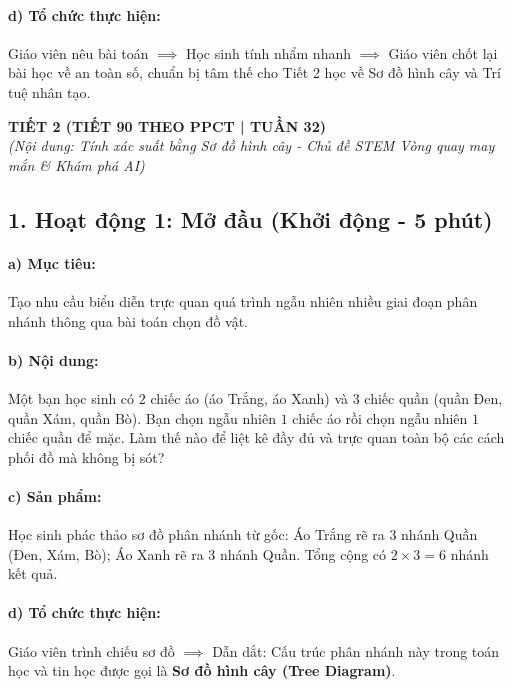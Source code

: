 \documentclass[12pt, a4paper]{article}
\begin{document}
\paragraph{d) Tổ chức thực hiện:} Giáo viên nêu bài toán $\implies$ Học sinh tính nhẩm nhanh $\implies$ Giáo viên chốt lại bài học về an toàn số, chuẩn bị tâm thế cho Tiết 2 học về Sơ đồ hình cây và Trí tuệ nhân tạo.

\newpage

\begin{center}
    \textbf{\large TIẾT 2 (TIẾT 90 THEO PPCT | TUẦN 32)}\\[4pt]
    \textit{(Nội dung: Tính xác suất bằng Sơ đồ hình cây - Chủ đề STEM Vòng quay may mắn \& Khám phá AI)}
\end{center}

\subsection*{1. Hoạt động 1: Mở đầu (Khởi động - 5 phút)}

\paragraph{a) Mục tiêu:} Tạo nhu cầu biểu diễn trực quan quá trình ngẫu nhiên nhiều giai đoạn phân nhánh thông qua bài toán chọn đồ vật.

\paragraph{b) Nội dung:} Một bạn học sinh có $2$ chiếc áo (áo Trắng, áo Xanh) và $3$ chiếc quần (quần Đen, quần Xám, quần Bò). Bạn chọn ngẫu nhiên $1$ chiếc áo rồi chọn ngẫu nhiên $1$ chiếc quần để mặc. Làm thế nào để liệt kê đầy đủ và trực quan toàn bộ các cách phối đồ mà không bị sót?

\paragraph{c) Sản phẩm:} Học sinh phác thảo sơ đồ phân nhánh từ gốc: Áo Trắng rẽ ra 3 nhánh Quần (Đen, Xám, Bò); Áo Xanh rẽ ra 3 nhánh Quần. Tổng cộng có $2 \times 3 = 6$ nhánh kết quả.

\paragraph{d) Tổ chức thực hiện:} Giáo viên trình chiếu sơ đồ $\implies$ Dẫn dắt: Cấu trúc phân nhánh này trong toán học và tin học được gọi là \textbf{Sơ đồ hình cây (Tree Diagram)}.
\end{document}
